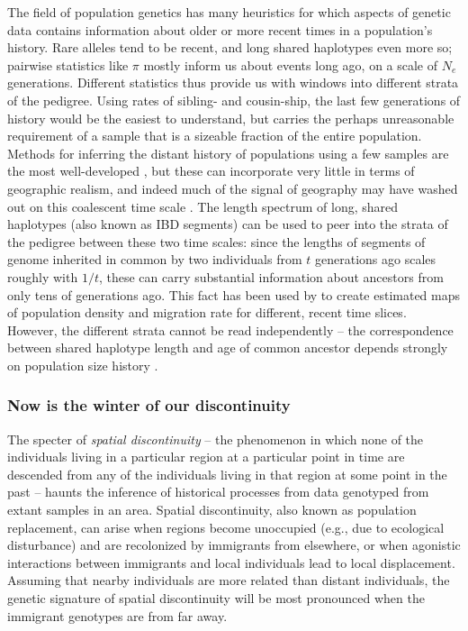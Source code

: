 \documentclass{ar-1col}
\newcommand{\plr}[1]{{\color{green}{#1}}}
\begin{document}
The field of population genetics
has many heuristics for which aspects of genetic data
contains information about older or more recent times in a population's history.
Rare alleles tend to be recent,
and long shared haplotypes even more so;
pairwise statistics like $\pi$ mostly inform us about events long ago,
on a scale of $N_e$ generations.
Different statistics thus provide us with windows into different strata of the pedigree.
Using rates of sibling- and cousin-ship,
the last few generations of history would be the easiest to understand,
but carries the perhaps unreasonable requirement of a sample 
that is a sizeable fraction of the entire population.
Methods for inferring the distant history of populations using a few samples
are the most well-developed \citep[e.g.,]{dadi,psmc,momi},
but these can incorporate very little in terms of geographic realism,
and indeed much of the signal of geography 
may have washed out on this coalescent time scale \citep{wilkins2004separationoftimescales}.
The length spectrum of long, shared haplotypes
(also known as IBD segments)
can be used to peer into the strata of the pedigree between these two time scales:
since the lengths of segments of genome inherited in common by two individuals
from $t$ generations ago scales roughly with $1/t$, 
these can carry substantial information about ancestors from only tens of generations ago.
This fact has been used by \citet{alasadi2018estimating}
to create estimated maps of population density and migration rate
for different, recent time slices.
However, the different strata cannot be read independently
-- the correspondence between shared haplotype length and age of common ancestor
depends strongly on population size history \citep{ralph2013geography}.


\subsubsection{Now is the winter of our discontinuity}

\plr{shorten this up, I think, and call it something besides discontinuity? I have not heard this, and connotes other things to me.}

The specter of \textit{spatial discontinuity} --
the phenomenon in which none of the individuals 
living in a particular region at a particular point in time 
are descended from any of the individuals living in that region 
at some point in the past
-- haunts the inference of historical processes
from data genotyped from extant samples in an area.
Spatial discontinuity, 
also known as population replacement, 
can arise when regions become unoccupied
(e.g., due to ecological disturbance) 
and are recolonized by immigrants from elsewhere, 
or when agonistic interactions between immigrants and local individuals 
lead to local displacement. 
Assuming that nearby individuals are more related than distant individuals, 
the genetic signature of spatial discontinuity will be most pronounced 
when the immigrant genotypes are from far away.
\end{document}

